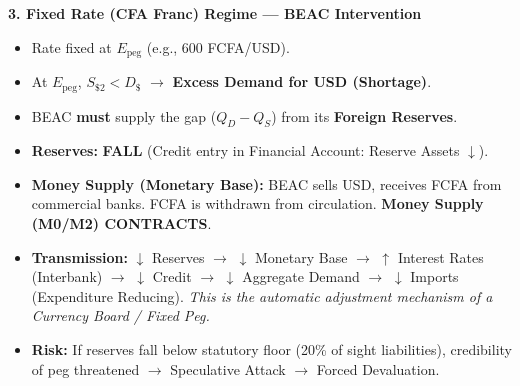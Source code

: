 \documentclass[11pt]{article}
\begin{document}
\begin{exoresolu}
\textbf{3. Fixed Rate (CFA Franc) Regime — BEAC Intervention}
\begin{itemize}
    \item Rate fixed at $E_{\text{peg}}$ (e.g., 600 FCFA/USD).
    \item At $E_{\text{peg}}$, $S_{\$2} < D_\$$ $\rightarrow$ \textbf{Excess Demand for USD (Shortage)}.
    \item BEAC \textbf{must} supply the gap ($Q_D - Q_S$) from its \textbf{Foreign Reserves}.
    \item \textbf{Reserves:} \textbf{FALL} (Credit entry in Financial Account: Reserve Assets $\downarrow$).
    \item \textbf{Money Supply (Monetary Base):} BEAC sells USD, receives FCFA from commercial banks. FCFA is withdrawn from circulation. \textbf{Money Supply (M0/M2) CONTRACTS}.
    \item \textbf{Transmission:} $\downarrow$ Reserves $\rightarrow$ $\downarrow$ Monetary Base $\rightarrow$ $\uparrow$ Interest Rates (Interbank) $\rightarrow$ $\downarrow$ Credit $\rightarrow$ $\downarrow$ Aggregate Demand $\rightarrow$ $\downarrow$ Imports (Expenditure Reducing). \textit{This is the automatic adjustment mechanism of a Currency Board / Fixed Peg.}
    \item \textbf{Risk:} If reserves fall below statutory floor (20\% of sight liabilities), credibility of peg threatened $\rightarrow$ Speculative Attack $\rightarrow$ Forced Devaluation.
\end{itemize}


\end{exoresolu}
\end{document}
